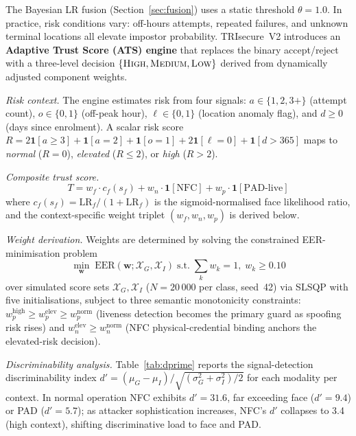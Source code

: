 \documentclass[pdflatex,sn-vancouver-num]{sn-jnl}%
\theoremstyle{thmstyleone}%
\theoremstyle{thmstyletwo}%
\theoremstyle{thmstylethree}%
\begin{document}
The Bayesian LR fusion (Section~\ref{sec:fusion}) uses a static threshold
\(\theta=1.0\). In practice, risk conditions vary: off-hours attempts, repeated
failures, and unknown terminal locations all elevate impostor probability.
TRIsecure~V2 introduces an \textbf{Adaptive Trust Score (ATS) engine} that
replaces the binary accept/reject with a three-level decision
\(\{\textsc{High}, \textsc{Medium}, \textsc{Low}\}\) derived from dynamically
adjusted component weights.

\textit{Risk context.} The engine estimates risk from four signals:
\(a \in \{1,2,3+\}\) (attempt count), \(o \in \{0,1\}\) (off-peak hour),
\(\ell \in \{0,1\}\) (location anomaly flag), and \(d \geq 0\) (days since
enrolment). A scalar risk score
\(R = 2\mathbf{1}[a \geq 3] + \mathbf{1}[a=2] + \mathbf{1}[o=1] +
2\mathbf{1}[\ell=0] + \mathbf{1}[d>365]\) maps to \textit{normal} (\(R=0\)),
\textit{elevated} (\(R \leq 2\)), or \textit{high} (\(R>2\)).

\textit{Composite trust score.}
\begin{equation}
  T = w_f \cdot c_f(s_f) + w_n \cdot \mathbf{1}[\mathrm{NFC}]
        + w_p \cdot \mathbf{1}[\mathrm{PAD\text{-}live}]
  \label{eq:ats}
\end{equation}
where \(c_f(s_f) = \mathrm{LR}_f/(1+\mathrm{LR}_f)\) is the
sigmoid-normalised face likelihood ratio, and the context-specific weight
triplet \((w_f, w_n, w_p)\) is derived below.

\textit{Weight derivation.} Weights are determined by solving the constrained
EER-minimisation problem
\begin{equation}
  \min_{\mathbf{w}}\;\mathrm{EER}(\mathbf{w};\mathcal{X}_G,\mathcal{X}_I)
  \;\text{s.t.}\;\textstyle\sum_k w_k = 1,\; w_k \geq 0.10
  \label{eq:ats_opt}
\end{equation}
over simulated score sets \(\mathcal{X}_G, \mathcal{X}_I\) (\(N{=}20\,000\)
per class, seed~42) via SLSQP with five initialisations, subject to three
semantic monotonicity constraints: \(w_p^\text{high}\!\geq
w_p^\text{elev}\!\geq w_p^\text{norm}\) (liveness detection becomes the
primary guard as spoofing risk rises) and \(w_n^\text{elev}\!\geq
w_n^\text{norm}\) (NFC physical-credential binding anchors the elevated-risk
decision).

\textit{Discriminability analysis.} Table~\ref{tab:dprime} reports the
signal-detection discriminability index
\(d' = (\mu_G - \mu_I)/\sqrt{(\sigma_G^2+\sigma_I^2)/2}\) for each modality
per context. In normal operation NFC exhibits \(d'=31.6\), far exceeding face
(\(d'=9.4\)) or PAD (\(d'=5.7\)); as attacker sophistication increases, NFC's
\(d'\) collapses to 3.4 (high context), shifting discriminative load to face
and PAD.
\end{document}
